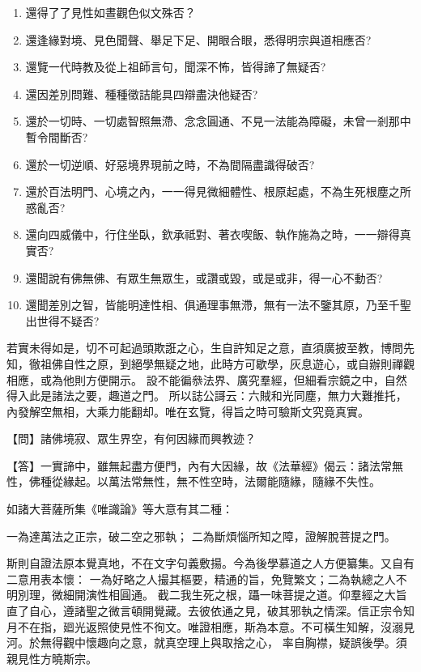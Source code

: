 \begin{enumerate}[label = (\chinese*)]
\item  還得了了見性如晝觀色似文殊否？
\item 還逢緣對境、見色聞聲、舉足下足、開眼合眼，悉得明宗與道相應否?
\item 還覽一代時教及從上祖師言句，聞深不怖，皆得諦了無疑否?
\item 還因差別問難、種種徵詰能具四辯盡決他疑否?
\item 還於一切時、一切處智照無滯、念念圓通、不見一法能為障礙，未曾一剎那中暫令間斷否?
\item 還於一切逆順、好惡境界現前之時，不為間隔盡識得破否?
\item 還於百法明門、心境之內，一一得見微細體性、根原起處，不為生死根塵之所惑亂否?
\item 還向四威儀中，行住坐臥，欽承祗對、著衣喫飯、執作施為之時，一一辯得真實否?
\item 還聞說有佛無佛、有眾生無眾生，或讚或毀，或是或非，得一心不動否?
\item 還聞差別之智，皆能明達性相、俱通理事無滯，無有一法不鑒其原，乃至千聖出世得不疑否?
\end{enumerate}

若實未得如是，切不可起過頭欺誑之心，生自許知足之意，直須廣披至教，博問先知，徹祖佛自性之原，到絕學無疑之地，此時方可歇學，灰息遊心，或自辦則禪觀相應，或為他則方便開示。
設不能徧叅法界、廣究羣經，但細看宗鏡之中，自然得入此是諸法之要，趣道之門。
所以誌公謌云：{\kaishu 六賊和光同塵，無力大難推托，內發解空無相，大乘力能翻却}。唯在玄覽，得旨之時可驗斯文究竟真實。

{\heiti 【問】諸佛境寂、眾生界空，有何因緣而興教迹？}

【答】一實諦中，雖無起盡方便門，內有大因緣，故《法華經》偈云：{\kaishu 諸法常無性，佛種從緣起}。以萬法常無性，無不性空時，法爾能隨緣，隨緣不失性。

如諸大菩薩所集《唯識論》等大意有其二種：

一為達萬法之正宗，破二空之邪執；
二為斷煩惱所知之障，證解脫菩提之門。

斯則自證法原本覺真地，不在文字句義敷揚。今為後學慕道之人方便纂集。又自有二意用表本懷：
一為好略之人撮其樞要，精通的旨，免覽繁文；二為執總之人不明別理，微細開演性相圓通。
截二我生死之根，躡一味菩提之道。仰羣經之大旨直了自心，遵諸聖之微言頓開覺藏。去彼依通之見，破其邪執之情深。信正宗令知月不在指，廻光返照使見性不徇文。唯證相應，斯為本意。不可橫生知解，沒溺見河。於無得觀中懷趣向之意，就真空理上與取捨之心，
率自胸襟，疑誤後學。須親見性方曉斯宗。

